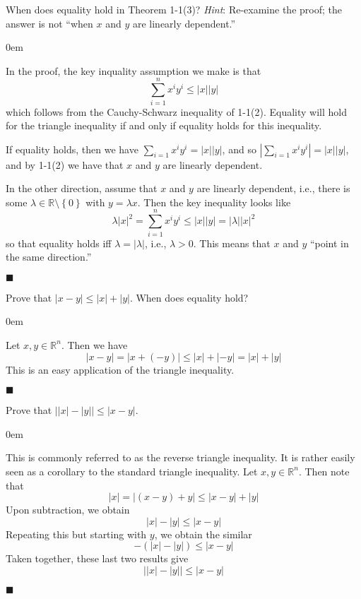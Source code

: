 \documentclass[12pt]{article}
\renewcommand{\qed}{\hfill$\blacksquare$}
\renewenvironment{proof}{\begin{addmargin}[1em]{0em}\begin{newproof}}{\end{newproof}\end{addmargin}\qed}
\newenvironment{problem}[2][Problem]{\begin{trivlist}
\item[\hskip \labelsep {\bfseries #1}\hskip \labelsep {\bfseries #2.}]}{\end{trivlist}}
\begin{document}
\begin{problem}{1-2}
When does equality hold in Theorem 1-1(3)? \textit{Hint}: Re-examine the proof; the answer is not ``when $x$ and $y$ are linearly dependent.''
\end{problem}
\begin{proof}
In the proof, the key inquality assumption we make is that $$ \sum_{i=1}^n x^i y^i \leq \left|x\right|\left|y\right| $$ which follows from the Cauchy-Schwarz inequality of 1-1(2). Equality will hold for the triangle inequality if and only if equality holds for this inequality. 

If equality holds, then we have $ \sum_{i=1} x^i y^i = \left|x\right|\left|y\right|$, and so $\left|\sum_{i=1} x^i y^i \right| = \left|x\right|\left|y\right|$, and by 1-1(2) we have that $x$ and $y$ are linearly dependent. 

In the other direction, assume that $x$ and $y$ are linearly dependent, i.e., there is some $\lambda \in \mathbb{R}\setminus \left\{0\right\}$ with $y = \lambda x$. Then the key inequality looks like $$ \lambda \left|x\right|^2   = \sum_{i=1}^n x^i y^i \leq \left|x\right|\left|y\right| = \left|\lambda\right| \left|x\right|^2 $$ so that equality holds iff $ \lambda = \left|\lambda\right|$, i.e., $\lambda >0$. This means that $x$ and $y$ ``point in the same direction.''
\end{proof}





\begin{problem}{1-3}
Prove that $\left|x-y\right| \leq \left|x\right| + \left|y\right|$. When does equality hold?
\end{problem}
\begin{proof}
Let $x,y \in \mathbb{R}^n$. Then we have
$$ \left|x-y\right| = \left|x + \left(-y\right)\right| \leq \left|x\right| + \left| -y\right| = \left|x\right| + \left| y\right| $$ This is an easy application of the triangle inequality.
\end{proof}



\begin{problem}{1-4}
Prove that $\left| \left|x\right|- \left|y\right| \right| \leq \left|x-y\right|$. 
\end{problem}
\begin{proof}
This is commonly referred to as the reverse triangle inequality. It is rather easily seen as a corollary to the standard triangle inequality. Let $x,y \in \mathbb{R}^n$. Then note that
$$ \left| x\right| = \left| \left(x-y\right) + y \right| \leq \left|x-y\right| + \left|y\right| $$ Upon subtraction, we obtain
$$ \left|x\right| - \left|y\right| \leq \left|x-y\right| $$
Repeating this but starting with $y$, we obtain the similar
$$ - \left( \left|x\right| - \left|y\right| \right) \leq \left|x-y\right| $$
Taken together, these last two results give
$$ \left| \left|x\right| - \left|y\right| \right| \leq \left|x-y\right| $$
\end{proof}
\end{document}
